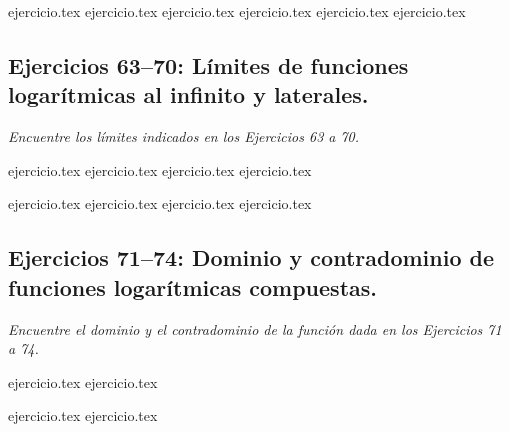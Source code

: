 \begin{enumerate}
    \setcounter{enumi}{56}
    {ejercicio.tex}
    {ejercicio.tex}
    {ejercicio.tex}
    {ejercicio.tex}
    {ejercicio.tex}
    {ejercicio.tex}
\end{enumerate}

\subsection*{Ejercicios 63--70: Límites de funciones logarítmicas al infinito y laterales.}

\noindent \textit{Encuentre los límites indicados en los Ejercicios 63 a 70.}

\begin{enumerate}
    \setcounter{enumi}{62}
    \begin{minipage}{0.45\textwidth}
    {ejercicio.tex}
    {ejercicio.tex}
    {ejercicio.tex}
    {ejercicio.tex}
    \end{minipage}%
    \begin{minipage}{0.45\textwidth}
    {ejercicio.tex}
    {ejercicio.tex}
    {ejercicio.tex}
    {ejercicio.tex}
    \end{minipage}
\end{enumerate}

\subsection*{Ejercicios 71--74: Dominio y contradominio de funciones logarítmicas compuestas.}

\noindent \textit{Encuentre el dominio y el contradominio de la función dada en los Ejercicios 71 a 74.}

\begin{enumerate}
    \setcounter{enumi}{70}
    \begin{minipage}{0.45\textwidth}
    {ejercicio.tex}
    {ejercicio.tex}
    \end{minipage}%
    \begin{minipage}{0.45\textwidth}
    {ejercicio.tex}
    {ejercicio.tex}
    \end{minipage}
\end{enumerate}

